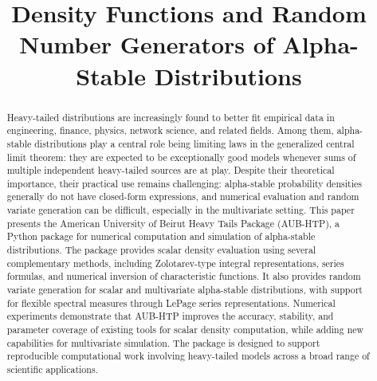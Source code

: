\usepackage{graphicx}
\usepackage{amsmath, amssymb,amsthm}
\usepackage{subcaption}
\usepackage{float}
\usepackage{booktabs}
\usepackage{array}
\usepackage{xcolor}
\usepackage{esint}
\usepackage{enumitem}
\usepackage{listings}
\usepackage{minted}%
\usepackage[toc,page]{appendix}
\usepackage{lipsum} %
\usepackage{url}
\usepackage[a4paper, margin=0.75in]{geometry}
\usepackage[colorlinks=true, linkcolor=blue, citecolor=blue, urlcolor=blue]{hyperref}
\newcommand{\ii}{\mathrm{i}}

\newtheorem{definition}{Definition}[section]
\newtheorem{property}{Property}
\newtheorem{lemma}{Lemma}
\newtheorem{theorem}{Theorem}
\usepackage{algorithm}
\usepackage{algpseudocode}
\usepackage[font=small,labelfont=bf]{caption}
\usepackage{authblk}

\title{Density Functions and Random Number Generators of Alpha-Stable Distributions}

\begin{abstract}
Heavy-tailed distributions are increasingly found to better fit empirical data in engineering, finance, physics, network science, and related fields. Among them, alpha-stable distributions play a central role being limiting laws in the generalized central limit theorem: they are expected to be exceptionally good models whenever sums of multiple independent heavy-tailed sources are at play. Despite their theoretical importance, their practical use remains challenging: alpha-stable probability densities generally do not have closed-form expressions, and numerical evaluation and random variate generation can be difficult, especially in the multivariate setting. This paper presents the American University of Beirut Heavy Tails Package (AUB-HTP), a Python package for numerical computation and simulation of alpha-stable distributions. The package provides scalar density evaluation using several complementary methods, including Zolotarev-type integral representations, series formulas, and numerical inversion of characteristic functions. It also provides random variate generation for scalar and multivariate alpha-stable distributions, with support for flexible spectral measures through LePage series representations. Numerical experiments demonstrate that AUB-HTP improves the accuracy, stability, and parameter coverage of existing tools for scalar density computation, while adding new capabilities for multivariate simulation. The package is designed to support reproducible computational work involving heavy-tailed models across a broad range of scientific applications.
\end{abstract}

